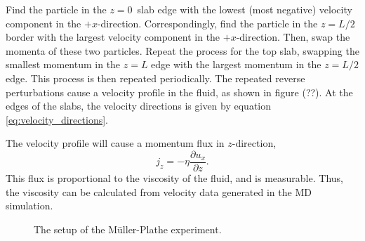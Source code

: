 Find the particle in the \(z = 0\) slab edge with the lowest 
(most negative) velocity component in the \(+x\)-direction.
Correspondingly, find the particle in the \(z = L/2\) border 
with the largest velocity component in the \(+x\)-direction.
Then, swap the momenta of these two particles.
Repeat the process for the top slab, swapping the smallest momentum 
in the \(z = L\) edge with the largest momentum in the \(z = L/2\) edge.
This process is then repeated periodically.
The repeated reverse perturbations cause a velocity profile in the fluid,
as shown in figure (??). %
At the edges of the slabs, the velocity directions 
is given by equation \eqref{eq:velocity_directions}.

The velocity profile will cause a momentum flux in $z$-direction,
\[
    \label{eq:momentum_flux}
    j_z = -\eta \frac{\partial u_x}{\partial z}.
\]
This flux is proportional to the viscosity of the fluid, and is measurable.
Thus, the viscosity can be calculated from velocity data generated in the 
MD simulation.

\begin{figure}
    \begin{center}
        
        \caption{The setup of the Müller-Plathe experiment.}
    \end{center}
\end{figure}
